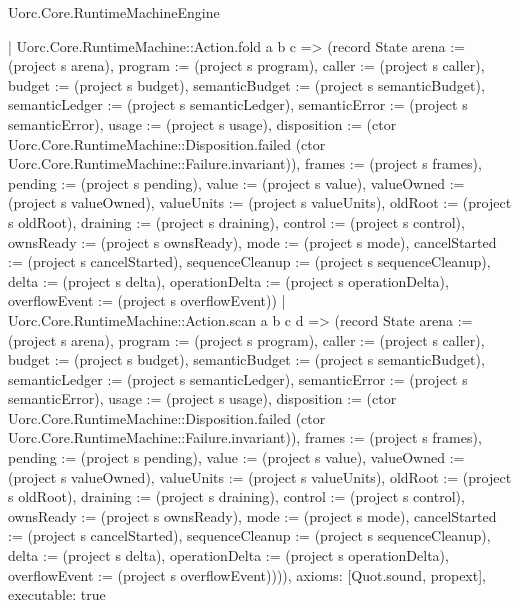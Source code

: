 \begin{lexlean}{Uorc.Core.RuntimeMachineEngine}
\begin{semanticmodule}
{      | Uorc.Core.RuntimeMachine::Action.fold a b c => (record State {arena := (project s arena), program := (project s program), caller := (project s caller), budget := (project s budget), semanticBudget := (project s semanticBudget), semanticLedger := (project s semanticLedger), semanticError := (project s semanticError), usage := (project s usage), disposition := (ctor Uorc.Core.RuntimeMachine::Disposition.failed (ctor Uorc.Core.RuntimeMachine::Failure.invariant)), frames := (project s frames), pending := (project s pending), value := (project s value), valueOwned := (project s valueOwned), valueUnits := (project s valueUnits), oldRoot := (project s oldRoot), draining := (project s draining), control := (project s control), ownsReady := (project s ownsReady), mode := (project s mode), cancelStarted := (project s cancelStarted), sequenceCleanup := (project s sequenceCleanup), delta := (project s delta), operationDelta := (project s operationDelta), overflowEvent := (project s overflowEvent)})
      | Uorc.Core.RuntimeMachine::Action.scan a b c d => (record State {arena := (project s arena), program := (project s program), caller := (project s caller), budget := (project s budget), semanticBudget := (project s semanticBudget), semanticLedger := (project s semanticLedger), semanticError := (project s semanticError), usage := (project s usage), disposition := (ctor Uorc.Core.RuntimeMachine::Disposition.failed (ctor Uorc.Core.RuntimeMachine::Failure.invariant)), frames := (project s frames), pending := (project s pending), value := (project s value), valueOwned := (project s valueOwned), valueUnits := (project s valueUnits), oldRoot := (project s oldRoot), draining := (project s draining), control := (project s control), ownsReady := (project s ownsReady), mode := (project s mode), cancelStarted := (project s cancelStarted), sequenceCleanup := (project s sequenceCleanup), delta := (project s delta), operationDelta := (project s operationDelta), overflowEvent := (project s overflowEvent)}))),
  axioms: [Quot.sound, propext],
  executable: true
}


\end{semanticmodule}
\end{lexlean}
